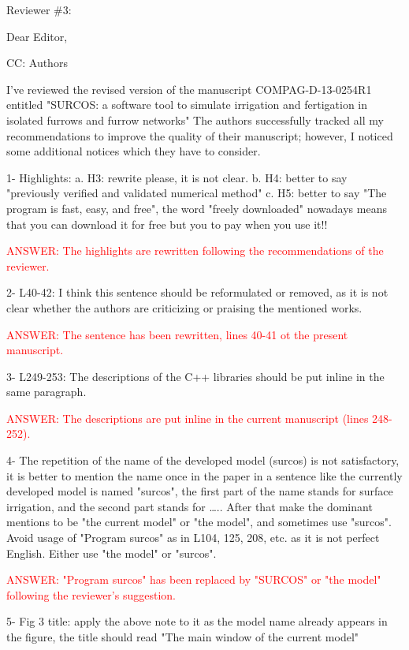 \documentclass[a4paper]{article}
\begin{document}
\vspace{5mm}

Reviewer \#3: 

Dear Editor,

CC: Authors

I've reviewed the revised version of the manuscript COMPAG-D-13-0254R1 entitled "SURCOS: a software tool to simulate irrigation and fertigation in isolated furrows and furrow networks"
The authors successfully tracked all my recommendations to improve the quality of their manuscript; however, I noticed some additional notices which they have to consider.

1-	Highlights:
a.	H3: rewrite please, it is not clear.
b.	H4: better to say "previously verified and validated numerical method"
c.	H5: better to say "The program is fast, easy, and free", the word "freely downloaded" nowadays means that you can download it for free but you to pay when you use it!!

\textcolor{red}{ANSWER: The highlights are rewritten following the recommendations of the reviewer.}

2-	L40-42: I think this sentence should be reformulated or removed, as it is not clear whether the authors are criticizing or praising the mentioned works.

\textcolor{red}{ANSWER: The sentence has been rewritten, lines 40-41 ot the present manuscript.}

3-	L249-253: The descriptions of the C++ libraries should be put inline in the same paragraph.

\textcolor{red}{ANSWER: The descriptions are put inline in the current manuscript (lines 248-252).}

4-	The repetition of the name of the developed model (surcos) is not satisfactory, it is better to mention the name once in the paper in a sentence like {the currently developed model is named "surcos", the first part of the name stands for surface irrigation, and the second part stands for ….}. After that make the dominant mentions to be "the current model" or "the model", and sometimes use "surcos". Avoid usage of "Program surcos" as in L104, 125, 208, etc. as it is not perfect English. Either use "the model" or "surcos". 

\textcolor{red}{ANSWER: "Program surcos" has been replaced by "SURCOS" or "the model" following the reviewer's suggestion.}

5-	Fig 3 title: apply the above note to it as the model name already appears in the figure, the title should read "The main window of the current model"
\end{document}
